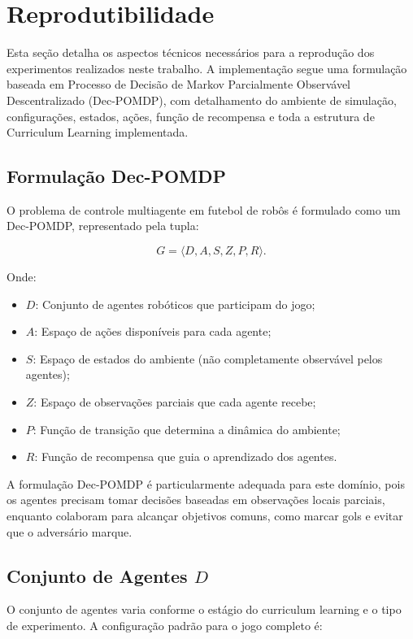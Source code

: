 \section{Reprodutibilidade}
\label{sec:reprodutibilidade}
Esta seção detalha os aspectos técnicos necessários para a reprodução dos experimentos realizados neste trabalho. A implementação segue uma formulação baseada em Processo de Decisão de Markov Parcialmente Observável Descentralizado (Dec-POMDP), com detalhamento do ambiente de simulação, configurações, estados, ações, função de recompensa e toda a estrutura de Curriculum Learning implementada.

\subsection{Formulação Dec-POMDP}

O problema de controle multiagente em futebol de robôs é formulado como um Dec-POMDP, representado pela tupla:

$$G = \langle D, A, S, Z, P, R \rangle.$$

Onde:
\begin{itemize}
    \item $D$: Conjunto de agentes robóticos que participam do jogo;
    \item $A$: Espaço de ações disponíveis para cada agente;
    \item $S$: Espaço de estados do ambiente (não completamente observável pelos agentes);
    \item $Z$: Espaço de observações parciais que cada agente recebe;
    \item $P$: Função de transição que determina a dinâmica do ambiente;
    \item $R$: Função de recompensa que guia o aprendizado dos agentes.
\end{itemize}

A formulação Dec-POMDP é particularmente adequada para este domínio, pois os agentes precisam tomar decisões baseadas em observações locais parciais, enquanto colaboram para alcançar objetivos comuns, como marcar gols e evitar que o adversário marque.

\subsection{Conjunto de Agentes $D$}

O conjunto de agentes varia conforme o estágio do curriculum learning e o tipo de experimento. A configuração padrão para o jogo completo é:

